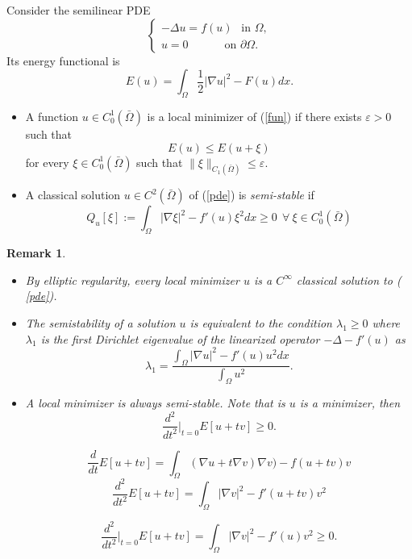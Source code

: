 \documentclass[paper=a4, fontsize=11pt]{scrartcl} %
\numberwithin{equation}{section} %
\numberwithin{figure}{section} %
\numberwithin{table}{section} %
\newtheorem{remark}{Remark}
\numberwithin{exercise}{section}
\begin{document}
Consider the semilinear PDE 
\begin{equation}\label{pde}       
\begin{cases} -\Delta u=f(u)\:\: \mbox{ in } \Omega,\\
u=0  \:\:\:\:\:\: \:\:\:\:\:\:\:\mbox{  on  }      \partial \Omega.

\end{cases}
\end{equation}
Its energy functional is 
\begin{equation}\label{fun}
E(u)=\int_{\Omega} \frac{1}{2} |\nabla u|^2-F(u)dx.
\end{equation}
\begin{itemize}


\item A function $u\in C_{0}^1(\bar{\Omega})$ is a local minimizer of (\ref{fun}) if there exists $\varepsilon>0$ such that 
$$E(u)\leq E(u+\xi)$$
for every $\xi\in  C_{0}^1(\bar{\Omega})$ such that $\|\xi\|_{C_1(\bar{\Omega})}\leq \varepsilon.$
\item A classical solution $u\in C^2(\bar{\Omega})$ of (\ref{pde}) is \emph{semi-stable} if
\begin{equation}\label{stable}
Q_{u}[\xi]:=\int_{\Omega} |\nabla \xi|^2-f'(u)\xi^2 dx\geq 0 \: \:\forall  \:\xi \in C_{0}^1(\bar{\Omega})
\end{equation}
\end{itemize}
\begin{remark}
\begin{itemize}
\item By elliptic regularity, every local minimizer $u$ is a $C^\infty$ classical solution to ( \ref{pde}).
\item The semistability of a solution $u$ is equivalent to the condition $\lambda_1\geq 0$ where $\lambda_1$ is the first Dirichlet eigenvalue of the linearized operator $-\Delta -f'(u)$  as
$$\lambda_1=\frac{\int_{\Omega}|\nabla u|^2-f'(u) u^2 dx}{\int_{\Omega} u^2}.$$
\item A local minimizer is always semi-stable. Note that is $u$ is a minimizer, then 
$$\frac{d^2}{dt^2}\Big |_{t=0} E[u+tv]\geq 0.$$

$$\frac{d}{dt} E[u+tv]=\int_{\Omega} (\nabla u +t\nabla v) \nabla v)- f(u+tv)v$$
$$\frac{d^2}{dt^2} E[u+tv]=\int_{\Omega} |\nabla v|^2-f'(u+tv)v^2$$

$$\frac{d^2}{dt^2}\Big |_{t=0} E[u+tv]=\int_{\Omega} |\nabla v|^2-f'(u)v^2\geq 0.$$
\end{itemize}

\end{remark}
\end{document}
